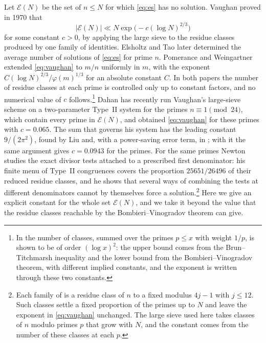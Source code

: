 \documentclass[aps,prd,twocolumn,superscriptaddress,nofootinbib,longbibliography,floatfix,showkeys,nobalancelastpage,amsmath,amssymb,10pt]{revtex4-2}
\theoremstyle{plain}
\theoremstyle{definition}
\theoremstyle{plain}
\newcommand{\Ex}{\mathcal{E}}
\begin{document}
Let $\Ex(N)$ be the set of $n\le N$ for which \eqref{eq:es} has no solution. Vaughan \cite{Vau} proved in 1970 that
\begin{equation}\label{eq:vaughan}
|\Ex(N)|\ll N\exp\bigl(-c(\log N)^{2/3}\bigr)
\end{equation}
for some constant $c>0$, by applying the large sieve to the residue classes produced by one family of identities. Elsholtz and Tao \cite{ET} later determined the average number of solutions of \eqref{eq:es} for prime $n$. Pomerance and Weingartner \cite{PW} extended \eqref{eq:vaughan} to $m/n$ uniformly in $m$, with the exponent $C(\log N)^{2/3}/\varphi(m)^{1/3}$ for an absolute constant $C$. In both papers the number of residue classes at each prime is controlled only up to constant factors, and no numerical value of $c$ follows.\footnote{In \cite[Section~4]{PW} the number of classes, summed over the primes $p\le x$ with weight $1/p$, is shown to be of order $(\log x)^2$: the upper bound comes from the Brun--Titchmarsh inequality and the lower bound from the Bombieri--Vinogradov theorem, with different implied constants, and the exponent is written through these two constants.} Dahan \cite{Dah} has recently run Vaughan's large-sieve scheme on a two-parameter Type~II system for the primes $n\equiv1\pmod{24}$, which contain every prime in $\Ex(N)$, and obtained \eqref{eq:vaughan} for these primes with $c=0.065$. The sum that governs his system has the leading constant $9/(2\pi^2)$, found by Liu \cite{Liu} and, with a power-saving error term, in \cite{BBv1}; with it the same argument gives $c=0.0943$ for the primes. For the same primes Newton \cite{New} studies the exact divisor tests attached to a prescribed first denominator: his finite menu of Type~II congruences covers the proportion $25651/26496$ of their reduced residue classes, and he shows that several ways of combining the tests at different denominators cannot by themselves force a solution.\footnote{Each family of \cite[Section~3]{New} is a residue class of $n$ to a fixed modulus $4j-1$ with $j\le12$. Such classes settle a fixed proportion of the primes up to $N$ and leave the exponent in \eqref{eq:vaughan} unchanged. The large sieve used here takes classes of $n$ modulo primes $p$ that grow with $N$, and the constant comes from the number of these classes at each $p$.} Here we give an explicit constant for the whole set $\Ex(N)$, and we take it beyond the value that the residue classes reachable by the Bombieri--Vinogradov theorem can give.
\end{document}
